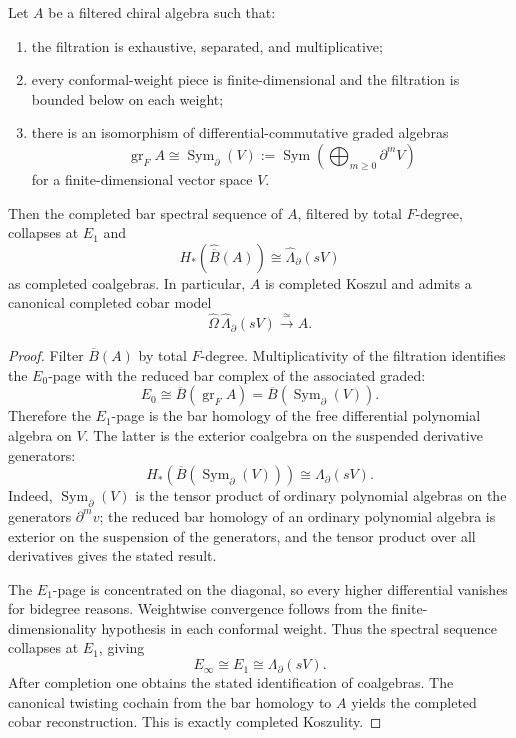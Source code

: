 \begin{theorem}
\label{thm:pbw-slodowy-collapse}
Let $A$ be a filtered chiral algebra such that:
\begin{enumerate}[label=(\roman*)]
\item the filtration is exhaustive, separated, and multiplicative;
\item every conformal-weight piece is finite-dimensional and the filtration is
  bounded below on each weight;
\item there is an isomorphism of differential-commutative graded algebras
\[
\operatorname{gr}_F A \cong \operatorname{Sym}_{\partial}(V)
:= \operatorname{Sym}\!\left(\bigoplus_{m \geq 0}\partial^m V\right)
\]
for a finite-dimensional vector space $V$.
\end{enumerate}
Then the completed bar spectral sequence of $A$, filtered by total
$F$-degree, collapses at $E_1$ and
\[
H_*\!\left(\widehat{\overline B}(A)\right)
\cong \widehat{\Lambda}_{\partial}(sV)
\]
as completed coalgebras.  In particular, $A$ is completed Koszul and admits a
canonical completed cobar model
\[
\widehat{\Omega}\,\widehat{\Lambda}_{\partial}(sV)\xrightarrow{\simeq} A .
\]
\end{theorem}

\begin{proof}
Filter $\overline B(A)$ by total $F$-degree.  Multiplicativity of the
filtration identifies the $E_0$-page with the reduced bar complex of the
associated graded:
\[
E_0 \cong \overline B(\operatorname{gr}_F A)
= \overline B(\operatorname{Sym}_{\partial}(V)).
\]
Therefore the $E_1$-page is the bar homology of the free differential polynomial
algebra on $V$.  The latter is the exterior coalgebra on the suspended
derivative generators:
\[
H_*\!\left(\overline B(\operatorname{Sym}_{\partial}(V))\right)
\cong \Lambda_{\partial}(sV).
\]
Indeed, $\operatorname{Sym}_{\partial}(V)$ is the tensor product of ordinary
polynomial algebras on the generators $\partial^m v$; the reduced bar homology
of an ordinary polynomial algebra is exterior on the suspension of the
generators, and the tensor product over all derivatives gives the stated result.

The $E_1$-page is concentrated on the diagonal, so every higher differential
vanishes for bidegree reasons.  Weightwise convergence follows from the
finite-dimensionality hypothesis in each conformal weight.  Thus the spectral
sequence collapses at $E_1$, giving
\[
E_{\infty}\cong E_1\cong \Lambda_{\partial}(sV).
\]
After completion one obtains the stated identification of coalgebras.  The
canonical twisting cochain from the bar homology to $A$ yields the completed
cobar reconstruction.  This is exactly completed Koszulity.
\end{proof}

